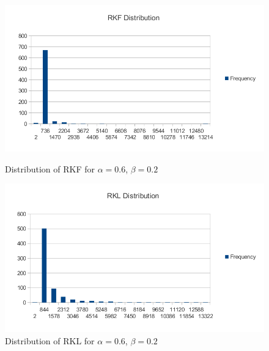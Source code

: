 \documentclass{article} %
\begin{document}
\begin{figure}[ht]
\begin{minipage}[b]{0.6\linewidth}
\centering
\includegraphics[width=\textwidth]{rkf.png}
\caption{Distribution of RKF for $\alpha=0.6$, $\beta=0.2$}
\label{fig:RKF}
\end{minipage}
\hspace{0.2cm}
\begin{minipage}[b]{0.6\linewidth}
\centering
\includegraphics[width=\textwidth]{rkl.png}
\caption{Distribution of RKL for $\alpha=0.6$, $\beta=0.2$}
\label{fig:RKL}
\end{minipage}
\end{figure}
\end{document}
